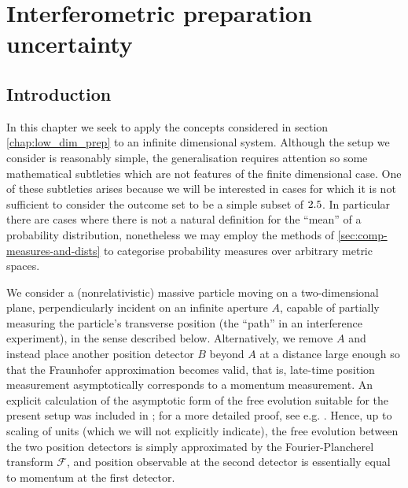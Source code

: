 \chapter{Interferometric preparation uncertainty}\label{chap:interferometric_prep_ur}

\section{Introduction} 

In this chapter we seek to apply the concepts considered in section \ref{chap:low_dim_prep} to an infinite dimensional system. Although the setup we consider is reasonably simple, the generalisation requires attention so some mathematical subtleties which are not features of the finite dimensional case. One of these subtleties arises because we will be interested in cases for which it is not sufficient to consider the outcome set to be a simple subset of $2.5$. In particular there are cases where there is not a natural definition for the ``mean'' of a probability distribution, nonetheless we may employ the methods of \ref{sec:comp-measures-and-dists} to categorise probability measures over arbitrary metric spaces.

We consider a (nonrelativistic) massive particle moving on a two-dimensional plane, perpendicularly incident on an infinite aperture $A$, capable of partially measuring the particle's transverse position (the ``path'' in an interference experiment), in the sense described below. Alternatively, we remove $A$ and instead place another position detector $B$ beyond $A$ at a distance large 
enough so that the Fraunhofer approximation becomes valid, that is, late-time position measurement asymptotically corresponds to a momentum measurement. An explicit calculation of the asymptotic form of the free evolution suitable for the present setup was included in \cite{BB2013}; for a more detailed proof, see e.g. \cite[Theorem IX.31]{RSII}. Hence, up to scaling of units (which we will not explicitly indicate), the free evolution between the two position detectors is simply approximated by the Fourier-Plancherel transform $\mathcal F$, and position observable at the second detector is essentially equal to momentum at the first detector.

